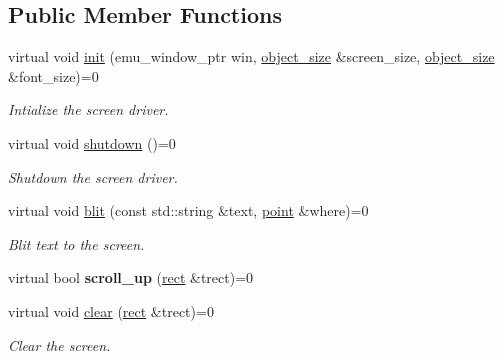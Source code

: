 \subsection*{Public Member Functions}
\begin{DoxyCompactItemize}
\item 
virtual void \mbox{\hyperlink{classeka2l1_1_1driver_1_1screen__driver_a3005e77e403bc233112e7b9f32873b72}{init}} (emu\+\_\+window\+\_\+ptr win, \mbox{\hyperlink{structeka2l1_1_1object__size}{object\+\_\+size}} \&screen\+\_\+size, \mbox{\hyperlink{structeka2l1_1_1object__size}{object\+\_\+size}} \&font\+\_\+size)=0
\begin{DoxyCompactList}\small\item\em Intialize the screen driver. \end{DoxyCompactList}\item 
\mbox{\label{classeka2l1_1_1driver_1_1screen__driver_adc2ea05dd3fb16b321787ae8ffcc0adc}} 
virtual void \mbox{\hyperlink{classeka2l1_1_1driver_1_1screen__driver_adc2ea05dd3fb16b321787ae8ffcc0adc}{shutdown}} ()=0
\begin{DoxyCompactList}\small\item\em Shutdown the screen driver. \end{DoxyCompactList}\item 
virtual void \mbox{\hyperlink{classeka2l1_1_1driver_1_1screen__driver_a8517ad66ef54e263f3ce38ac5fb34347}{blit}} (const std\+::string \&text, \mbox{\hyperlink{structeka2l1_1_1vec2}{point}} \&where)=0
\begin{DoxyCompactList}\small\item\em Blit text to the screen. \end{DoxyCompactList}\item 
\mbox{\label{classeka2l1_1_1driver_1_1screen__driver_a15a6d51a861f2318252255fd239d8228}} 
virtual bool {\bfseries scroll\+\_\+up} (\mbox{\hyperlink{structeka2l1_1_1rect}{rect}} \&trect)=0
\item 
virtual void \mbox{\hyperlink{classeka2l1_1_1driver_1_1screen__driver_a9b963b43dc70b16781121238f713acb3}{clear}} (\mbox{\hyperlink{structeka2l1_1_1rect}{rect}} \&trect)=0
\begin{DoxyCompactList}\small\item\em Clear the screen. \end{DoxyCompactList}\item 

\end{DoxyCompactItemize}
